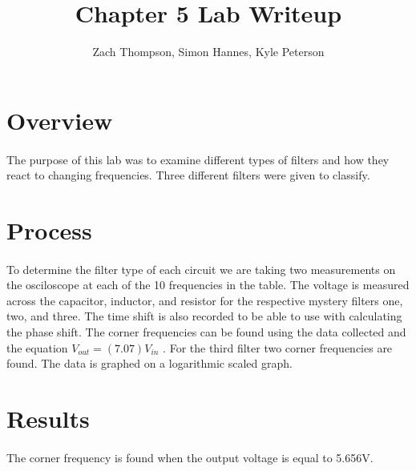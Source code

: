 \documentclass{article}
\title{Chapter 5 Lab Writeup}
\author{Zach Thompson, Simon Hannes, Kyle Peterson}
\begin{document}
\maketitle{}

\section*{Overview}
\paragraph{}
The purpose of this lab was to examine different types of filters and how they react to changing frequencies.
Three different filters were given to classify.



\section*{Process}
\paragraph{}
To determine the filter type of each circuit we are taking two measurements on the osciloscope at each of the 
10 frequencies in the table. The voltage is measured across the capacitor, inductor, and resistor for the 
respective mystery filters one, two, and three. The time shift is also recorded to be able to use with 
calculating the phase shift. The corner frequencies can be found using the data collected and the equation 
$ V_{out} = (7.07)   V_{in}$ . For the third filter two corner frequencies are found. The data is graphed on 
a logarithmic scaled graph.

\section*{Results}
\paragraph{}
The corner frequency is found when the output voltage is equal to 5.656V.
\end{document}
